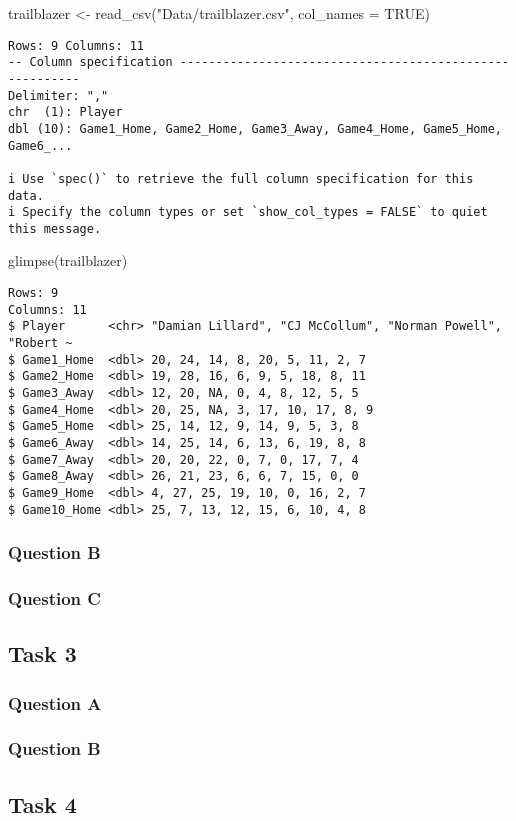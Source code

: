 \documentclass[
  letterpaper,
  DIV=11,
  numbers=noendperiod]{scrartcl}
\newenvironment{Shaded}{\begin{snugshade}}{\end{snugshade}}
\newcommand{\AttributeTok}[1]{\textcolor[rgb]{0.40,0.45,0.13}{#1}}
\newcommand{\ConstantTok}[1]{\textcolor[rgb]{0.56,0.35,0.01}{#1}}
\newcommand{\FunctionTok}[1]{\textcolor[rgb]{0.28,0.35,0.67}{#1}}
\newcommand{\NormalTok}[1]{\textcolor[rgb]{0.00,0.23,0.31}{#1}}
\newcommand{\OtherTok}[1]{\textcolor[rgb]{0.00,0.23,0.31}{#1}}
\newcommand{\StringTok}[1]{\textcolor[rgb]{0.13,0.47,0.30}{#1}}
\begin{document}
\begin{Shaded}
\begin{Highlighting}[]
\NormalTok{trailblazer }\OtherTok{\textless{}{-}} \FunctionTok{read\_csv}\NormalTok{(}\StringTok{"Data/trailblazer.csv"}\NormalTok{,}
                        \AttributeTok{col\_names =} \ConstantTok{TRUE}\NormalTok{)}
\end{Highlighting}
\end{Shaded}

\begin{verbatim}
Rows: 9 Columns: 11
-- Column specification --------------------------------------------------------
Delimiter: ","
chr  (1): Player
dbl (10): Game1_Home, Game2_Home, Game3_Away, Game4_Home, Game5_Home, Game6_...

i Use `spec()` to retrieve the full column specification for this data.
i Specify the column types or set `show_col_types = FALSE` to quiet this message.
\end{verbatim}

\begin{Shaded}
\begin{Highlighting}[]
\FunctionTok{glimpse}\NormalTok{(trailblazer)}
\end{Highlighting}
\end{Shaded}

\begin{verbatim}
Rows: 9
Columns: 11
$ Player      <chr> "Damian Lillard", "CJ McCollum", "Norman Powell", "Robert ~
$ Game1_Home  <dbl> 20, 24, 14, 8, 20, 5, 11, 2, 7
$ Game2_Home  <dbl> 19, 28, 16, 6, 9, 5, 18, 8, 11
$ Game3_Away  <dbl> 12, 20, NA, 0, 4, 8, 12, 5, 5
$ Game4_Home  <dbl> 20, 25, NA, 3, 17, 10, 17, 8, 9
$ Game5_Home  <dbl> 25, 14, 12, 9, 14, 9, 5, 3, 8
$ Game6_Away  <dbl> 14, 25, 14, 6, 13, 6, 19, 8, 8
$ Game7_Away  <dbl> 20, 20, 22, 0, 7, 0, 17, 7, 4
$ Game8_Away  <dbl> 26, 21, 23, 6, 6, 7, 15, 0, 0
$ Game9_Home  <dbl> 4, 27, 25, 19, 10, 0, 16, 2, 7
$ Game10_Home <dbl> 25, 7, 13, 12, 15, 6, 10, 4, 8
\end{verbatim}

\subsubsection{Question B}\label{question-b-1}

\subsubsection{Question C}\label{question-c}

\subsection{Task 3}\label{task-3}

\subsubsection{Question A}\label{question-a-2}

\subsubsection{Question B}\label{question-b-2}

\subsection{Task 4}\label{task-4}
\end{document}
